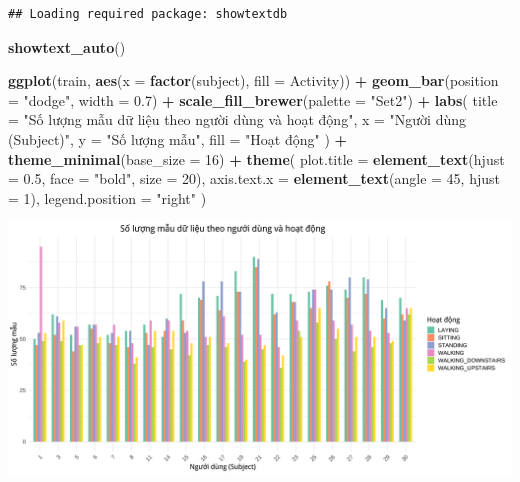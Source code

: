 \documentclass[
]{article}
\newenvironment{Shaded}{\begin{snugshade}}{\end{snugshade}}
\newcommand{\AttributeTok}[1]{\textcolor[rgb]{0.13,0.29,0.53}{#1}}
\newcommand{\DecValTok}[1]{\textcolor[rgb]{0.00,0.00,0.81}{#1}}
\newcommand{\FloatTok}[1]{\textcolor[rgb]{0.00,0.00,0.81}{#1}}
\newcommand{\FunctionTok}[1]{\textcolor[rgb]{0.13,0.29,0.53}{\textbf{#1}}}
\newcommand{\NormalTok}[1]{#1}
\newcommand{\SpecialCharTok}[1]{\textcolor[rgb]{0.81,0.36,0.00}{\textbf{#1}}}
\newcommand{\StringTok}[1]{\textcolor[rgb]{0.31,0.60,0.02}{#1}}
\begin{document}
\begin{verbatim}
## Loading required package: showtextdb
\end{verbatim}

\begin{Shaded}
\begin{Highlighting}[]
\FunctionTok{showtext\_auto}\NormalTok{()}

\FunctionTok{ggplot}\NormalTok{(train, }\FunctionTok{aes}\NormalTok{(}\AttributeTok{x =} \FunctionTok{factor}\NormalTok{(subject), }\AttributeTok{fill =}\NormalTok{ Activity)) }\SpecialCharTok{+}
  \FunctionTok{geom\_bar}\NormalTok{(}\AttributeTok{position =} \StringTok{"dodge"}\NormalTok{, }\AttributeTok{width =} \FloatTok{0.7}\NormalTok{) }\SpecialCharTok{+}
  \FunctionTok{scale\_fill\_brewer}\NormalTok{(}\AttributeTok{palette =} \StringTok{"Set2"}\NormalTok{) }\SpecialCharTok{+} 
  \FunctionTok{labs}\NormalTok{(}
    \AttributeTok{title =} \StringTok{"Số lượng mẫu dữ liệu theo người dùng và hoạt động"}\NormalTok{,}
    \AttributeTok{x =} \StringTok{"Người dùng (Subject)"}\NormalTok{,}
    \AttributeTok{y =} \StringTok{"Số lượng mẫu"}\NormalTok{,}
    \AttributeTok{fill =} \StringTok{"Hoạt động"}
\NormalTok{  ) }\SpecialCharTok{+}
  \FunctionTok{theme\_minimal}\NormalTok{(}\AttributeTok{base\_size =} \DecValTok{16}\NormalTok{) }\SpecialCharTok{+}
  \FunctionTok{theme}\NormalTok{(}
    \AttributeTok{plot.title =} \FunctionTok{element\_text}\NormalTok{(}\AttributeTok{hjust =} \FloatTok{0.5}\NormalTok{, }\AttributeTok{face =} \StringTok{"bold"}\NormalTok{, }\AttributeTok{size =} \DecValTok{20}\NormalTok{),}
    \AttributeTok{axis.text.x =} \FunctionTok{element\_text}\NormalTok{(}\AttributeTok{angle =} \DecValTok{45}\NormalTok{, }\AttributeTok{hjust =} \DecValTok{1}\NormalTok{),}
    \AttributeTok{legend.position =} \StringTok{"right"}
\NormalTok{  )}
\end{Highlighting}
\end{Shaded}

\includegraphics{report_files/figure-latex/unnamed-chunk-10-1.pdf}
\end{document}
